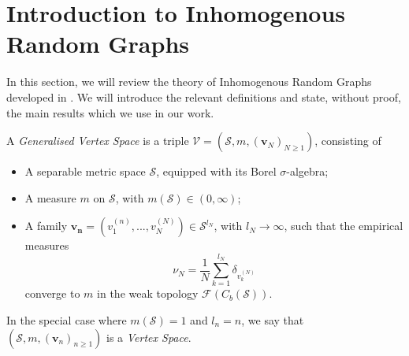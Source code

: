 
\section{Introduction to Inhomogenous Random Graphs}
In this section, we will review the theory of Inhomogenous Random Graphs developed in \cite{BJR07}. We will introduce the relevant definitions and state, without proof, the main results which we use in our work.
\begin{definition} \label{def: Generalised vertex space} A \emph{Generalised Vertex Space} is a triple $\mathcal{V}=(\mathcal{S}, m, (\mathbf{v}_N)_{N\geq 1})$, consisting of \begin{itemize}
    \item A separable metric space $\mathcal{S}$, equipped with its Borel $\sigma$-algebra;
    \item A measure $m$ on $\mathcal{S}$, with $m(\mathcal{S}) \in (0, \infty)$; 
    \item A family $\mathbf{v_n}=(v^{(n)}_1,...,v^{(N)}_N) \in \mathcal{S}^{l_N}$, with $l_N\rightarrow \infty$,  such that the empirical measures \begin{equation}
        \nu_N=\frac{1}{N}\sum_{k=1}^{l_N} \delta_{v^{(N)}_k} \end{equation} converge to $m$ in the weak topology $\mathcal{F}(C_b(\mathcal{S})).$

\end{itemize} In the special case where $m(\mathcal{S})=1$ and $l_n=n$, we say that $(\mathcal{S}, m, (\mathbf{v}_n)_{n\geq 1})$ is a \emph{Vertex Space}. \end{definition}  
